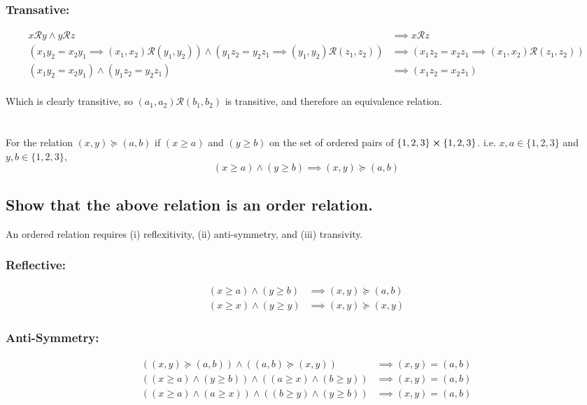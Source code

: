 \documentclass[]{article}
\newcommand{\Rel}{\mathcal{R}}
\begin{document}
\subsubsection{Transative:}
\begin{align*}
	x \Rel y \land y \Rel z
		&\implies x \Rel z\\
	(x_1 y_2 = x_2 y_1 \implies (x_1, x_2) \Rel (y_1, y_2))
	\land (y_1 z_2 = y_2 z_1 \implies (y_1, y_2) \Rel (z_1, z_2))
	&\implies (x_1 z_2 = x_2 z_1 \implies (x_1, x_2) \Rel (z_1, z_2))\\
	(x_1 y_2 = x_2 y_1) \land (y_1 z_2 = y_2 z_1)
	&\implies (x_1 z_2 = x_2 z_1)\\
\end{align*}

Which is clearly transitive, so $(a_1,a_2) \Rel (b_1,b_2)$ is transitive, and therefore 
an equivalence relation.

\newpage
\section{}
For the relation $(x,y) \succeq (a,b)$ if $(x \geq a)$ and $(y \geq b)$ on the set 
of ordered pairs of $\{1,2,3\} \cross \{1,2,3\}$.
i.e. $x,a \in \{1,2,3\}$ and $y,b \in \{1,2,3\}$,
$$(x \geq a) \land (y \geq b) \implies (x,y) \succeq (a,b)$$

\subsection{Show that the above relation is an order relation.}
An ordered relation requires (i) reflexitivity, (ii) anti-symmetry, and (iii) transivity.

\subsubsection{Reflective:}
\begin{align*}
	(x \geq a) \land (y \geq b) 
		&\implies (x,y) \succeq (a,b)\\
	(x \geq x) \land (y \geq y) 
		&\implies (x,y) \succeq (x,y)
\end{align*}

\subsubsection{Anti-Symmetry:}
\begin{align*}
	((x,y) \succeq (a,b)) \land ((a,b) \succeq (x,y))
		&\implies (x,y) = (a,b)\\
	((x \geq a) \land (y \geq b)) \land ((a \geq x) \land (b \geq y))
		&\implies (x,y) = (a,b)\\
	((x \geq a) \land (a \geq x)) \land ((b \geq y) \land (y \geq b))
		&\implies (x,y) = (a,b)
\end{align*}
\end{document}
